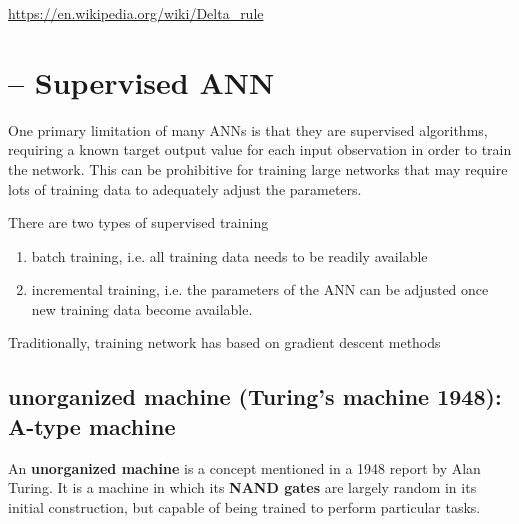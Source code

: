 \url{https://en.wikipedia.org/wiki/Delta_rule}

\section{-- Supervised ANN}
\label{sec:ANN-supervised}

One primary limitation of many ANNs is that they are supervised algorithms,
requiring a known target output value for each input observation in order to
train the network. This can be prohibitive for training large networks that may
require lots of training data to adequately adjust the parameters.

There are two types of supervised training
\begin{enumerate}
  \item batch training, i.e. all training data needs to be readily available
  
  \item incremental training, i.e. the parameters of the ANN can be adjusted
  once new training data become available.
\end{enumerate}

Traditionally, training network has based on gradient descent methods

\subsection{unorganized machine (Turing's machine 1948): A-type machine}


An {\bf unorganized machine} is a concept mentioned in a 1948 report by Alan
Turing. It is a machine in which its {\bf NAND gates} are largely random in its
initial construction, but capable of being trained to perform particular tasks.

